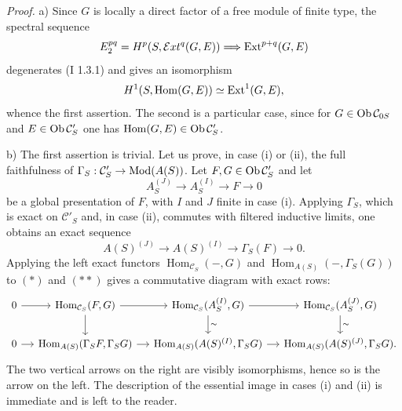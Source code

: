 \documentclass[11pt]{article}
\begin{document}
\emph{Proof.} a) Since $G$ is locally a direct factor of a free module of finite type, the spectral sequence
\[
E_2^{pq}=H^p(S,\mathcal{E}xt^q(G,E))\Longrightarrow \operatorname{Ext}^{p+q}(G,E)
\]
degenerates (I 1.3.1) and gives an isomorphism
\[
H^1(S,\operatorname{Hom}(G,E))\simeq \operatorname{Ext}^1(G,E),
\]
whence the first assertion. The second is a particular case, since for $G\in\operatorname{Ob}\mathcal C_{0S}$ and $E\in\operatorname{Ob}\mathcal C'_S$ one has $\operatorname{Hom}(G,E)\in\operatorname{Ob}\mathcal C'_S$.

b) The first assertion is trivial. Let us prove, in case (i) or (ii), the full faithfulness of $\Gamma_S:\mathcal C'_S\to\operatorname{Mod}(A(S))$. Let $F,G\in\operatorname{Ob}\mathcal C'_S$ and let
\[
A_S^{(J)}\longrightarrow A_S^{(I)}\longrightarrow F\longrightarrow0
\tag{$*$}
\]
be a global presentation of $F$, with $I$ and $J$ finite in case (i). Applying $\Gamma_S$, which is exact on $\mathcal C'_S$ and, in case (ii), commutes with filtered inductive limits, one obtains an exact sequence
\[
A(S)^{(J)}\longrightarrow A(S)^{(I)}\longrightarrow\Gamma_S(F)\longrightarrow0.
\tag{$**$}
\]
Applying the left exact functors $\operatorname{Hom}_{\mathcal C_S}(-,G)$ and $\operatorname{Hom}_{A(S)}(-,\Gamma_S(G))$ to $(*)$ and $(**)$ gives a commutative diagram with exact rows:
\[
\begin{tikzcd}[column sep=small]
0 \arrow[r] & \operatorname{Hom}_{\mathcal C_S}(F,G) \arrow[r] \arrow[d] &
\operatorname{Hom}_{\mathcal C_S}(A_S^{(I)},G) \arrow[r] \arrow[d,"\sim"] &
\operatorname{Hom}_{\mathcal C_S}(A_S^{(J)},G) \arrow[d,"\sim"] \\
0 \arrow[r] & \operatorname{Hom}_{A(S)}(\Gamma_SF,\Gamma_SG) \arrow[r] &
\operatorname{Hom}_{A(S)}(A(S)^{(I)},\Gamma_SG) \arrow[r] &
\operatorname{Hom}_{A(S)}(A(S)^{(J)},\Gamma_SG).
\end{tikzcd}
\]
The two vertical arrows on the right are visibly isomorphisms, hence so is the arrow on the left. The description of the essential image in cases (i) and (ii) is immediate and is left to the reader.
\end{document}

